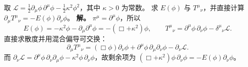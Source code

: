 \par
\begin{workedexample}
取 \(\mathcal L=\tfrac12\partial_\mu\phi\,\partial^\mu\phi-\tfrac12\kappa^2\phi^2\)，其中 \(\kappa>0\) 为常数。
求 \(E(\phi)\) 与 \(T^\mu{}_\nu\)，并直接计算
\(\partial_\mu T^\mu{}_\nu=-E(\phi)\partial_\nu\phi\)。
\textbf{解。} \(\pi^\mu=\partial^\mu\phi\)，所以
\[
E(\phi)=-\kappa^2\phi-\partial_\mu\partial^\mu\phi
=-(\Box+\kappa^2)\phi,\qquad
T^\mu{}_\nu=\partial^\mu\phi\,\partial_\nu\phi-\delta^\mu{}_\nu\mathcal L.
\]
直接求散度并用混合偏导可交换：
\[
\partial_\mu T^\mu{}_\nu
=(\Box\phi)\partial_\nu\phi
+\partial^\mu\phi\,\partial_\mu\partial_\nu\phi
-\partial_\nu\mathcal L.
\]
而 \(\partial_\nu\mathcal L=\partial^\mu\phi\,\partial_\nu\partial_\mu\phi-\kappa^2\phi\,\partial_\nu\phi\)，故剩余项为 \((\Box+\kappa^2)\phi\,\partial_\nu\phi=-E(\phi)\partial_\nu\phi\)。
\end{workedexample}
\par
